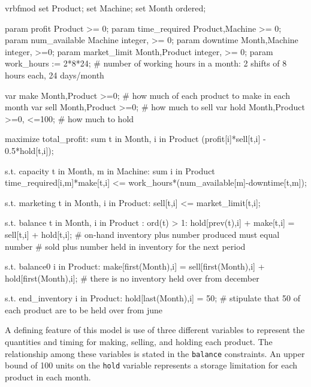 \begin{SaveVerbatim}{vrbfmod}
set Product;
set Machine;
set Month ordered;

param profit {Product} >= 0;
param time_required {Product,Machine} >= 0;
param num_available {Machine} integer, >= 0;
param downtime {Month,Machine} integer, >=0;
param market_limit {Month,Product} integer, >= 0;
param work_hours := 2*8*24;
# number of working hours in a month: 2 shifts of 8 hours each, 24 days/month

var make {Month,Product} >=0;  # how much of each product to make in each month
var sell {Month,Product} >=0;  # how much to sell
var hold {Month,Product} >=0, <=100;  # how much to hold

maximize total_profit:
  sum {t in Month, i in Product} (profit[i]*sell[t,i] - 0.5*hold[t,i]);

s.t. capacity {t in Month, m in Machine}:
sum {i in Product} time_required[i,m]*make[t,i] 
  <= work_hours*(num_available[m]-downtime[t,m]);

s.t. marketing {t in Month, i in Product}: sell[t,i] <= market_limit[t,i];

s.t. balance {t in Month, i in Product : ord(t) > 1}:
  hold[prev(t),i] + make[t,i] = sell[t,i] + hold[t,i];
# on-hand inventory plus number produced must equal number
# sold plus number held in inventory for the next period

s.t. balance0 {i in Product}:
  make[first(Month),i] = sell[first(Month),i] + hold[first(Month),i];
# there is no inventory held over from december

s.t. end_inventory {i in Product}: hold[last(Month),i] = 50;
# stipulate that 50 of each product are to be held over from june
\end{SaveVerbatim}

\begin{figure}
\end{figure}

A defining feature of this model is use of three different variables to represent
the quantities and timing for making, selling, and holding each product.
The relationship among these
variables is stated in the \texttt{balance} constraints.
An upper bound of 100 units on the \texttt{hold} variable represents a storage limitation 
for each product in each month.

